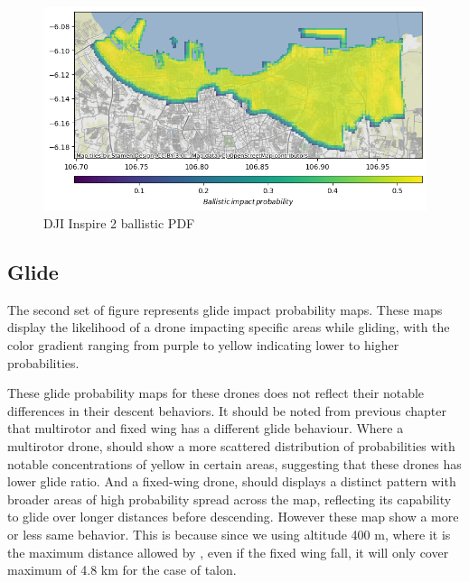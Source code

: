 \documentclass[12pt]{report}
\begin{document}
        \begin{figure}[H]
            \centering
            \includegraphics[width=\textwidth]{Plot/inspire/ballistic_pdf.png}
            \caption{DJI Inspire 2 ballistic PDF}
        \end{figure}

        \subsection{Glide}
        The second set of figure represents glide impact probability maps. These maps display the likelihood of a drone
        impacting specific areas while gliding, with the color gradient ranging from purple to yellow indicating lower
        to higher probabilities.
            
        These glide probability maps for these drones does not reflect their notable differences in their descent
        behaviors. It should be noted from previous chapter that multirotor and fixed wing has a different glide
        behaviour. Where a multirotor drone, should show a more scattered distribution of probabilities with notable
        concentrations of yellow in certain areas, suggesting that these drones has lower glide ratio. And a fixed-wing
        drone, should displays a distinct pattern with broader areas of high probability spread across the map,
        reflecting its capability to glide over longer distances before descending. However these map show a more or
        less same behavior. This is because since we using altitude 400 m, where it is the maximum distance allowed by
        \cite{arc_unmanned_2015}, even if the fixed wing fall, it will only cover maximum of 4.8 km for the case of
        talon.
            
\end{document}
